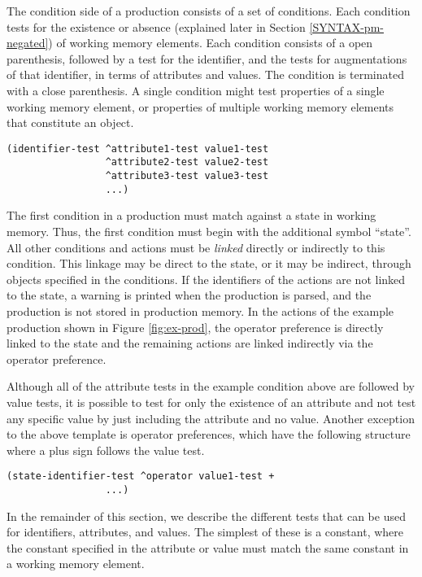 The condition side of a production consists of a set of conditions.
Each condition tests for the existence or absence (explained later in
Section \ref{SYNTAX-pm-negated}) of working memory elements. Each
condition consists of a open parenthesis, followed by a test for the
identifier, and the tests for augmentations of that identifier, in terms
of attributes and values.  The condition is terminated with a close
parenthesis. A single condition might test properties of a single
working memory element, or properties of multiple working memory
elements that constitute an object.  
\begin{verbatim}
(identifier-test ^attribute1-test value1-test 
                 ^attribute2-test value2-test
                 ^attribute3-test value3-test
                 ...)
\end{verbatim}
The first condition in a production must match against a state in
working memory.  Thus, the first condition must begin with the
additional symbol ``state''.  All other conditions and actions must be
\textit{linked} directly or indirectly to this condition. This linkage
may be direct to the state, or it may be indirect, through objects
specified in the conditions.  If the identifiers of the actions are not
linked to the state, a warning is printed when the production is parsed,
and the production is not stored in production memory.  In the actions
of the example production shown in Figure \ref{fig:ex-prod}, the
operator preference is directly linked to the state and the remaining
actions are linked indirectly via the operator preference.

Although all of the attribute tests in the example condition above are followed
by value tests, it is possible to test for only the existence of an
attribute and not test any specific value by just including the
attribute and no value.  Another exception to the above template is
operator preferences, which have the following structure where a plus
sign follows the value test.
\begin{verbatim}
(state-identifier-test ^operator value1-test +
                 ...)
\end{verbatim}

In the remainder of this section, we describe the different tests that
can be used for identifiers, attributes, and values.  The simplest of
these is a constant, where the constant specified in the attribute or
value must match the same constant in a working memory element.

